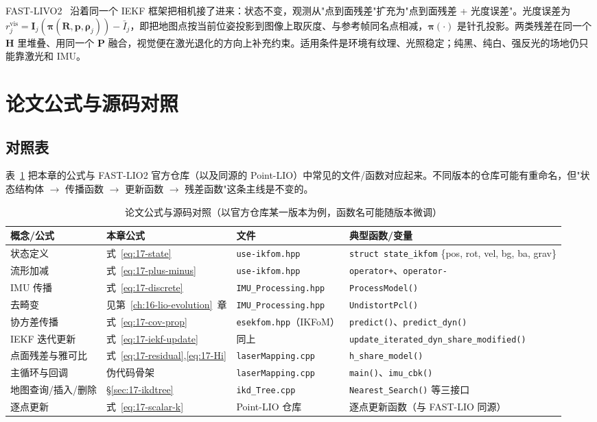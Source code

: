 FAST-LIVO2~\cite{yuan2024fastlivo2} 沿着同一个 IEKF 框架把相机接了进来：状态不变，观测从"点到面残差"扩充为"点到面残差 + 光度误差"。光度误差为 $r_j^{\mathrm{vis}}=\bm{I}_j(\bm{\pi}(\bm{R},\bm{p},\bm{\rho}_j))-\bar{I}_j$，即把地图点按当前位姿投影到图像上取灰度、与参考帧同名点相减，$\bm{\pi}(\cdot)$ 是针孔投影。两类残差在同一个 $\bm{H}$ 里堆叠、用同一个 $\bm{P}$ 融合，视觉便在激光退化的方向上补充约束。适用条件是环境有纹理、光照稳定；纯黑、纯白、强反光的场地仍只能靠激光和 IMU。

\section{论文公式与源码对照}\label{sec:17-code}

\subsection{对照表}

表~\ref{tab:17-code} 把本章的公式与 FAST-LIO2 官方仓库（以及同源的 Point-LIO）中常见的文件/函数对应起来。不同版本的仓库可能有重命名，但"状态结构体 $\to$ 传播函数 $\to$ 更新函数 $\to$ 残差函数"这条主线是不变的。

\begin{table}[htbp]
  \centering
  \caption{论文公式与源码对照（以官方仓库某一版本为例，函数名可能随版本微调）}\label{tab:17-code}
  \scriptsize
  \begin{tabular}{llll}
    \toprule
    概念/公式 & 本章公式 & 文件 & 典型函数/变量 \\
    \midrule
    状态定义 & 式~\eqref{eq:17-state} & \texttt{use-ikfom.hpp} & \texttt{struct state\_ikfom} \{pos, rot, vel, bg, ba, grav\} \\
    流形加减 & 式~\eqref{eq:17-plus-minus} & \texttt{use-ikfom.hpp} & \texttt{operator+}、\texttt{operator-} \\
    IMU 传播 & 式~\eqref{eq:17-discrete} & \texttt{IMU\_Processing.hpp} & \texttt{ProcessModel()} \\
    去畸变 & 见第~\ref{ch:16-lio-evolution}~章 & \texttt{IMU\_Processing.hpp} & \texttt{UndistortPcl()} \\
    协方差传播 & 式~\eqref{eq:17-cov-prop} & \texttt{esekfom.hpp}（IKFoM） & \texttt{predict()}、\texttt{predict\_dyn()} \\
    IEKF 迭代更新 & 式~\eqref{eq:17-iekf-update} & 同上 & \texttt{update\_iterated\_dyn\_share\_modified()} \\
    点面残差与雅可比 & 式~\eqref{eq:17-residual},\eqref{eq:17-Hi} & \texttt{laserMapping.cpp} & \texttt{h\_share\_model()} \\
    主循环与回调 & 伪代码骨架 & \texttt{laserMapping.cpp} & \texttt{main()}、\texttt{imu\_cbk()} \\
    地图查询/插入/删除 & \S\ref{sec:17-ikdtree} & \texttt{ikd\_Tree.cpp} & \texttt{Nearest\_Search()} 等三接口 \\
    逐点更新 & 式~\eqref{eq:17-scalar-k} & Point-LIO 仓库 & 逐点更新函数（与 FAST-LIO 同源） \\
    \bottomrule
  \end{tabular}
\end{table}

